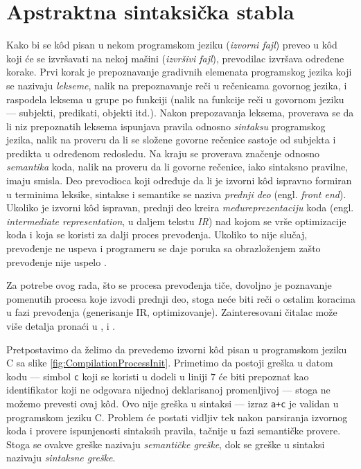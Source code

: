 \section{Apstraktna sintaksička stabla}
\label{sec:AST}

Kako bi se k\^od pisan u nekom programskom jeziku (\emph{izvorni fajl}) preveo u k\^od koji će se izvršavati na nekoj mašini (\emph{izvršivi fajl}), prevodilac izvršava određene korake. Prvi korak je prepoznavanje gradivnih elemenata programskog jezika koji se nazivaju \emph{lekseme}, nalik na prepoznavanje reči u rečenicama govornog jezika, i raspodela leksema u grupe po funkciji (nalik na funkcije reči u govornom jeziku --- subjekti, predikati, objekti itd.). Nakon prepozavanja leksema, proverava se da li niz prepoznatih leksema ispunjava pravila odnosno \emph{sintaksu} programskog jezika, nalik na proveru da li se složene govorne rečenice sastoje od subjekta i predikta u određenom redosledu. Na kraju se proverava značenje odnosno \emph{semantika} koda, nalik na proveru da li govorne rečenice, iako sintaksno pravilne, imaju smisla. Deo prevodioca koji određuje da li je izvorni k\^od ispravno formiran u terminima leksike, sintakse i semantike se naziva \emph{prednji deo} (engl. \emph{front end}). Ukoliko je izvorni k\^od ispravan, prednji deo kreira \emph{međureprezentaciju} koda (engl. \emph{intermediate representation}, u daljem tekstu \emph{IR}) nad kojom se vrše optimizacije koda i koja se koristi za dalji proces prevođenja. Ukoliko to nije slučaj, prevođenje ne uspeva i programeru se daje poruka sa obrazloženjem zašto prevođenje nije uspelo \cite{EngineeringCompilers}.

Za potrebe ovog rada, što se procesa prevođenja tiče, dovoljno je poznavanje pomenutih procesa koje izvodi prednji deo, stoga neće biti reči o ostalim koracima u fazi prevođenja (generisanje IR, optimizovanje). Zainteresovani čitalac može više detalja pronaći u \cite{DragonBook}, \cite{EngineeringCompilers} i \cite{CompilerConstruction}. 

Pretpostavimo da želimo da prevedemo izvorni k\^od pisan u programskom jeziku C sa slike \ref{fig:CompilationProcessInit}. Primetimo da postoji greška u datom kodu --- simbol \texttt{c} koji se koristi u dodeli u liniji $7$ će biti prepoznat kao identifikator koji ne odgovara nijednoj deklarisanoj promenljivoj --- stoga ne možemo prevesti ovaj k\^od. Ovo nije greška u sintaksi --- izraz \texttt{a+c} je validan u programskom jeziku C. Problem će postati vidljiv tek nakon parsiranja izvornog koda i provere ispunjenosti sintaksih pravila, tačnije u fazi semantičke provere. Stoga se ovakve greške nazivaju \emph{semantičke greške}, dok se greške u sintaksi nazivaju \emph{sintaksne greške}.

